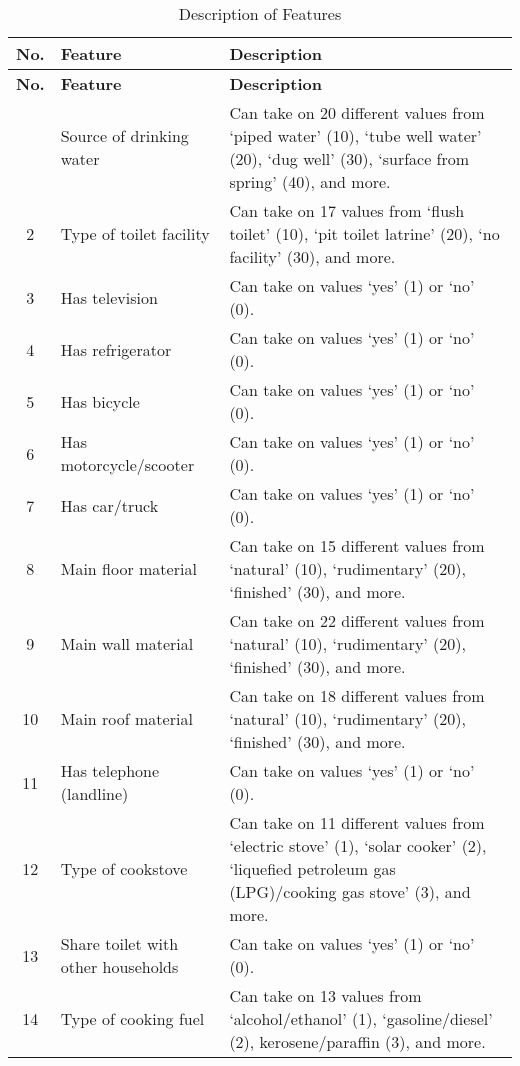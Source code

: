 \documentclass[a4paper,fleqn]{cas-sc}
\begin{document}
\begingroup
\begin{longtable}{c p{5cm} p{9cm}}
    \caption{Description of Features} \\
    \toprule
    \textbf{No.} & \textbf{Feature} & \textbf{Description} \\
    \midrule
    \endfirsthead
    \toprule
    \textbf{No.} & \textbf{Feature} & \textbf{Description} \\
    \midrule
    \endhead
    \bottomrule
    \endfoot
    \bottomrule
    \endlastfoot
    1 & Source of drinking water & Can take on 20 different values from ‘piped water’ (10), ‘tube well water’ (20), ‘dug well’ (30), ‘surface from spring’ (40), and more. \\ \midrule
    2 & Type of toilet facility & Can take on 17 values from ‘flush toilet’ (10), ‘pit toilet latrine’ (20), ‘no facility’ (30), and more. \\ \midrule
    3 & Has television & Can take on values ‘yes’ (1) or ‘no’ (0). \\ \midrule
    4 & Has refrigerator & Can take on values ‘yes’ (1) or ‘no’ (0). \\ \midrule
    5 & Has bicycle & Can take on values ‘yes’ (1) or ‘no’ (0). \\ \midrule
    6 & Has motorcycle/scooter & Can take on values ‘yes’ (1) or ‘no’ (0). \\ \midrule
    7 & Has car/truck & Can take on values ‘yes’ (1) or ‘no’ (0). \\ \midrule
    8 & Main floor material & Can take on 15 different values from ‘natural’ (10), ‘rudimentary’ (20), ‘finished’ (30), and more. \\ \midrule
    9 & Main wall material & Can take on 22 different values from ‘natural’ (10), ‘rudimentary’ (20), ‘finished’ (30), and more. \\ \midrule
    10 & Main roof material & Can take on 18 different values from ‘natural’ (10), ‘rudimentary’ (20), ‘finished’ (30), and more. \\ \midrule
    11 & Has telephone (landline) & Can take on values ‘yes’ (1) or ‘no’ (0). \\ \midrule
    12 & Type of cookstove & Can take on 11 different values from ‘electric stove’ (1), ‘solar cooker’ (2), ‘liquefied petroleum gas (LPG)/cooking gas stove’ (3), and more. \\ \midrule
    13 & Share toilet with other households & Can take on values ‘yes’ (1) or ‘no’ (0). \\ \midrule
    14 & Type of cooking fuel & Can take on 13 values from ‘alcohol/ethanol’ (1), ‘gasoline/diesel’ (2), kerosene/paraffin (3), and more. \\ \midrule

\end{longtable}
\end{document}
